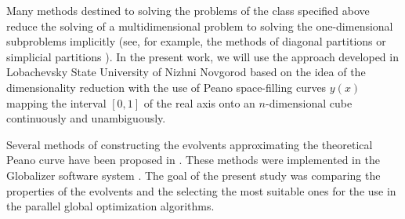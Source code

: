 \documentclass[procedia]{easychair}
\begin{document}
Many methods destined to solving the problems of the class specified above reduce the solving
of a multidimensional problem to solving the one-dimensional subproblems implicitly (see, for
example, the methods of diagonal partitions \cite{Sergeyev2006,SergeyevKvasov2015} or
simplicial partitions \cite{Zilinskas2008,Zilinskas2014}). In the present work, we will use the
approach developed in Lobachevsky State University of Nizhni Novgorod based on the idea of
the dimensionality reduction with the use of Peano space-filling curves $y(x)$ mapping the
interval $[0,1]$ of the real axis onto an $n$-dimensional cube continuously and unambiguously.

Several methods of constructing the evolvents approximating the theoretical Peano curve have
been proposed in \cite{strongin1978,Strongin1992,Goryachih2017,Gergel2009}. These
methods were implemented in the Globalizer software system \cite{globalizerSystem}. The goal
of the present study was comparing the properties of the evolvents and the selecting the most
suitable ones for the use in the parallel global optimization algorithms.
\end{document}
